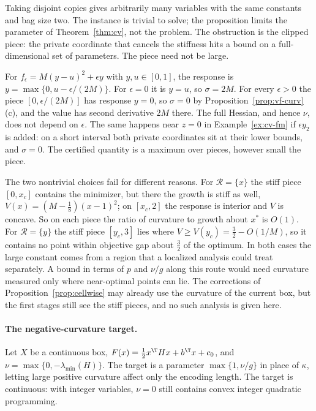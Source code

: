 Taking disjoint copies gives arbitrarily many variables with the same
constants and bag size two. The instance is trivial to solve; the proposition
limits the parameter of Theorem~\ref{thm:cv}, not the problem. The obstruction
is the clipped piece: the private coordinate that cancels the stiffness hits a
bound on a full-dimensional set of parameters. The piece need not be large.

\begin{remark}\label{rem:cv-unstable}
For $f_\epsilon=M(y-u)^2+\epsilon y$ with $y,u\in[0,1]$, the response is
$y=\max\{0,u-\epsilon/(2M)\}$. For $\epsilon=0$ it is $y=u$, so $\sigma=2M$.
For every $\epsilon>0$ the piece $[0,\epsilon/(2M)]$ has response $y=0$, so
$\sigma=0$ by Proposition~\ref{prop:vf-curv}(c), and the value has second
derivative $2M$ there. The full Hessian, and hence $\nu$, does not depend on
$\epsilon$. The same happens near $z=0$ in
Example~\ref{ex:cv-fm} if $\epsilon y_2$ is added: on a short interval both
private coordinates sit at their lower bounds, and $\sigma=0$. The certified
quantity is a maximum over pieces, however small the piece.
\end{remark}

The two nontrivial choices fail for different reasons. For
$\mathcal R=\{x\}$ the stiff piece $[0,x_c]$ contains the minimizer, but there
the growth is stiff as well, $V(x)=(M-\frac18)(x-1)^2$; on $[x_c,2]$ the
response is interior and $V$ is concave. So on each piece the ratio of
curvature to growth about $x^*$ is $O(1)$. For $\mathcal R=\{y\}$ the stiff
piece $[y_c,3]$ lies where $V\ge V(y_c)=\frac32-O(1/M)$, so it contains no
point within objective gap about $\frac32$ of the optimum. In both cases the
large constant comes from a region that a localized analysis could treat
separately. A bound in terms of $p$ and $\nu/g$ along this route would need
curvature measured only where near-optimal points can lie. The corrections of
Proposition~\ref{prop:cellwise} may already use the curvature of the current box, but
the first stages still see the stiff pieces, and no such analysis is given
here.

\paragraph{The negative-curvature target.}

Let $X$ be a continuous box, $F(x)=\frac12x^{\T}Hx+b^{\T}x+c_0$, and
$\nu=\max\{0,-\lambda_{\min}(H)\}$. The target is a parameter
$\max\{1,\nu/g\}$ in place of $\kappa$, letting large positive curvature affect
only the encoding length. The target is continuous: with integer variables,
$\nu=0$ still contains convex integer quadratic programming.

